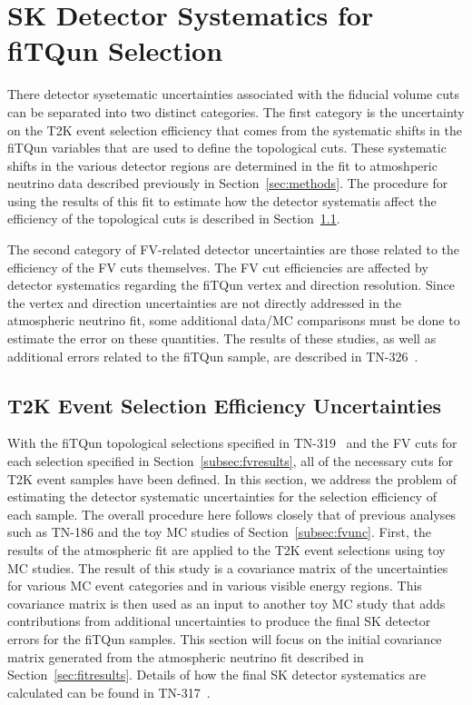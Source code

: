 

\section{SK Detector Systematics for fiTQun Selection}
\label{sec:skerr}

There detector sysetematic uncertainties associated with the fiducial volume
cuts can be separated into two distinct categories.  The first category is the
uncertainty on the T2K event selection efficiency that comes from the systematic
shifts in the fiTQun variables that are used to define the topological cuts.
These systematic shifts in the various detector regions are determined in the
fit to atmoshperic neutrino data described previously in Section~\ref{sec:methods}.
The procedure for using the results of this fit to estimate how the detector
systematis affect the efficiency of the topological cuts is described in Section~\ref{subsec:skselect}.

The second category of FV-related detector uncertainties are those related to the efficiency
of the FV cuts themselves.  The FV cut efficiencies are affected by detector systematics regarding
the fiTQun vertex and direction resolution.  Since the vertex and direction uncertainties are not 
directly addressed in the atmospheric neutrino fit, some additional data/MC comparisons must be done
to estimate the error on these quantities.  The results of these studies, as well as additional 
errors related to the fiTQun sample, are described in TN-326~\cite{tn326}.


\subsection{T2K Event Selection Efficiency Uncertainties}
\label{subsec:skselect}

With the fiTQun topological selections specified in TN-319~\cite{tn319} and the
FV cuts for each selection specified in Section~\ref{subsec:fvresults}, all of
the necessary cuts for T2K event samples have been defined.  In this section,
we address the problem of estimating the detector systematic uncertainties for
the selection efficiency of each sample.  The overall procedure here follows
closely that of previous analyses such as TN-186 and the toy MC studies of
Section~\ref{subsec:fvunc}.  First, the results of the atmospheric fit are
applied to the T2K event selections using toy MC studies. The result of this
study is a covariance matrix of the uncertainties for various MC event
categories and in various visible energy regions.  This covariance matrix is
then used as an input to another toy MC study that adds contributions from
additional uncertainties to produce the final SK detector errors for the fiTQun
samples.  This section will focus on the initial covariance matrix generated
from the atmospheric neutrino fit described in Section~\ref{sec:fitresults}.
Details of how the final SK detector systematics are calculated can be found in
TN-317~\cite{tn317}.

